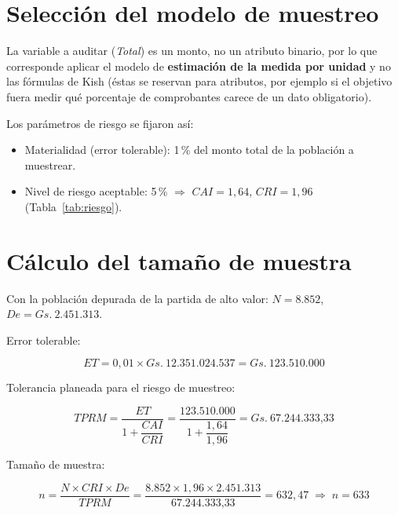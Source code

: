 \documentclass[12pt, a4paper]{article}
\newcommand{\Gs}[1]{Gs.\ \text{#1}}
\theoremstyle{plain}
\theoremstyle{definition}
\theoremstyle{remark}
\begin{document}
\section{Selección del modelo de muestreo}

La variable a auditar (\emph{Total}) es un monto, no un atributo
binario, por lo que corresponde aplicar el modelo de
\textbf{estimación de la medida por unidad} y no las fórmulas de Kish
(éstas se reservan para atributos, por ejemplo si el objetivo fuera medir
qué porcentaje de comprobantes carece de un dato obligatorio).

Los parámetros de riesgo se fijaron así: %

\begin{itemize}[nosep]
    \item Materialidad (error tolerable): 1\,\% del monto total de la
          población a muestrear.

    \item Nivel de riesgo aceptable: 5\,\% $\Rightarrow$ $CAI = 1{,}64$,
          $CRI = 1{,}96$ (Tabla~\ref{tab:riesgo}).
\end{itemize}

\section{Cálculo del tamaño de muestra}

Con la población depurada de la partida de alto valor:
$N = \text{8.852}$, $De = \Gs{2.451.313}$.

Error tolerable:

\[
    ET = 0{,}01 \times \Gs{12.351.024.537}
       = \Gs{123.510.000}
\]

Tolerancia planeada para el riesgo de muestreo:

\[
    TPRM = \frac{ET}{1 + \dfrac{CAI}{CRI}}
         = \frac{\text{123.510.000}}
                {1 + \dfrac{1{,}64}{1{,}96}}
         = \Gs{67.244.333{,}33}
\]

Tamaño de muestra:

\[
    n = \frac{N \times CRI \times De}{TPRM}
      = \frac{\text{8.852} \times 1{,}96 \times
              \text{2.451.313}}
             {\text{67.244.333{,}33}}
      = 632{,}47
      \;\Rightarrow\;
      n = 633
\]
\end{document}
